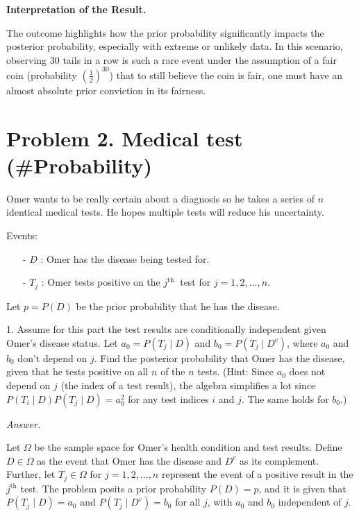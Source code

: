 \documentclass[12pt]{article}
\begin{document}
\textbf{Interpretation of the Result.}

The outcome highlights how the prior probability significantly impacts the posterior probability, especially with extreme or unlikely data. In this scenario, observing 30 tails in a row is such a rare event under the assumption of a fair coin (probability \( \left(\frac{1}{2}\right)^{30} \)) that to still believe the coin is fair, one must have an almost absolute prior conviction in its fairness.


\newpage
\section*{Problem 2. Medical test (\#Probability)}
Omer wants to be really certain about a diagnosis so he takes a series of \(n\) identical medical tests. He hopes multiple tests will reduce his uncertainty.

Events:
\begin{itemize}
    \item[-] \(D\) : Omer has the disease being tested for.
    \item[-]  \(T_j\) : Omer tests positive on the \(j^{\text {th }}\) test for \(j=1,2, \ldots, n\).
\end{itemize}

Let \(p=P(D)\) be the prior probability that he has the disease.

\begin{q}
1. Assume for this part the test results are conditionally independent given Omer's disease status. Let \(a_0=P\left(T_j \mid D\right)\) and \(b_0=P\left(T_j \mid D^c\right)\), where \(a_0\) and \(b_0\) don't depend on \(j\). Find the posterior probability that Omer has the disease, given that he tests positive on all \(n\) of the \(n\) tests. (Hint: Since \(a_0\) does not depend on \(j\) (the index of a test result), the algebra simplifies a lot since \(P\left(T_i \mid D\right) P\left(T_j \mid D\right)=a_0^2\) for any test indices \(i\) and \(j\). The same holds for \(b_0\).)
\end{q}
\textit{Answer.}

Let \( \Omega \) be the sample space for Omer's health condition and test results. Define \( D \in \Omega \) as the event that Omer has the disease and \( D^c \) as its complement. Further, let \( T_j \in \Omega \) for \( j = 1, 2, \ldots, n \) represent the event of a positive result in the \( j^\text{th} \) test. The problem posits a prior probability \( P(D) = p \), and it is given that \( P(T_j \mid D) = a_0 \) and \( P(T_j \mid D^c) = b_0 \) for all \( j \), with \( a_0 \) and \( b_0 \) independent of \( j \). 
\end{document}
